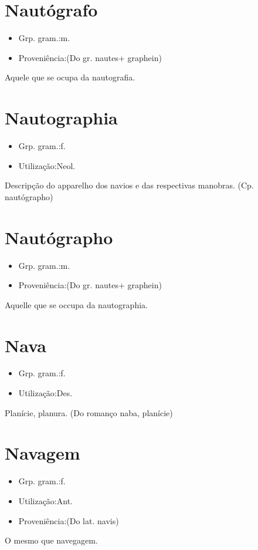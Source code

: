 \section{Nautógrafo}
\begin{itemize}
\item {Grp. gram.:m.}
\end{itemize}
\begin{itemize}
\item {Proveniência:(Do gr. \textunderscore nautes\textunderscore  + \textunderscore graphein\textunderscore )}
\end{itemize}
Aquele que se ocupa da nautografia.
\section{Nautographia}
\begin{itemize}
\item {Grp. gram.:f.}
\end{itemize}
\begin{itemize}
\item {Utilização:Neol.}
\end{itemize}
Descripção do apparelho dos navios e das respectivas manobras.
(Cp. \textunderscore nautógrapho\textunderscore )
\section{Nautógrapho}
\begin{itemize}
\item {Grp. gram.:m.}
\end{itemize}
\begin{itemize}
\item {Proveniência:(Do gr. \textunderscore nautes\textunderscore  + \textunderscore graphein\textunderscore )}
\end{itemize}
Aquelle que se occupa da nautographia.
\section{Nava}
\begin{itemize}
\item {Grp. gram.:f.}
\end{itemize}
\begin{itemize}
\item {Utilização:Des.}
\end{itemize}
Planície, planura.
(Do romanço \textunderscore naba\textunderscore , planície)
\section{Navagem}
\begin{itemize}
\item {Grp. gram.:f.}
\end{itemize}
\begin{itemize}
\item {Utilização:Ant.}
\end{itemize}
\begin{itemize}
\item {Proveniência:(Do lat. \textunderscore navis\textunderscore )}
\end{itemize}
O mesmo que \textunderscore navegagem\textunderscore .
